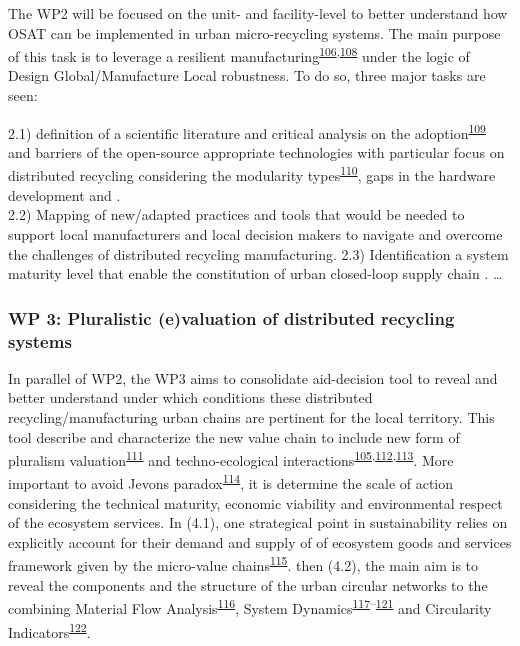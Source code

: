 \documentclass[
  11pt,
  a4paperpaper,
  onecolumn]{article}
\begin{document}
The WP2 will be focused on the unit- and facility-level to better
understand how OSAT can be implemented in urban micro-recycling systems.
The main purpose of this task is to leverage a resilient
manufacturing\textsuperscript{\protect\hyperlink{ref-xu2021e}{106},\protect\hyperlink{ref-zhang2011}{108}}
under the logic of Design Global/Manufacture Local robustness. To do so,
three major tasks are seen:

2.1) definition of a scientific literature and critical analysis on the
adoption\textsuperscript{\protect\hyperlink{ref-reinauer2021}{109}} and
barriers of the open-source appropriate technologies with particular
focus on distributed recycling considering the modularity
types\textsuperscript{\protect\hyperlink{ref-gavras2021}{110}}, gaps in
the hardware development and .\\
2.2) Mapping of new/adapted practices and tools that would be needed to
support local manufacturers and local decision makers to navigate and
overcome the challenges of distributed recycling manufacturing. 2.3)
Identification a system maturity level that enable the constitution of
urban closed-loop supply chain . \ldots{}

\hypertarget{wp-3-pluralistic-evaluation-of-distributed-recycling-systems}{%
\subsubsection{WP 3: Pluralistic (e)valuation of distributed recycling
systems}\label{wp-3-pluralistic-evaluation-of-distributed-recycling-systems}}

In parallel of WP2, the WP3 aims to consolidate aid-decision tool to
reveal and better understand under which conditions these distributed
recycling/manufacturing urban chains are pertinent for the local
territory. This tool describe and characterize the new value chain to
include new form of pluralism
valuation\textsuperscript{\protect\hyperlink{ref-gunton2022}{111}} and
techno-ecological
interactions\textsuperscript{\protect\hyperlink{ref-Saladini2018}{105},\protect\hyperlink{ref-Liu2020c}{112},\protect\hyperlink{ref-Liu2019g}{113}}.
More important to avoid Jevons
paradox\textsuperscript{\protect\hyperlink{ref-giampietro2018}{114}}, it
is determine the scale of action considering the technical maturity,
economic viability and environmental respect of the ecosystem services.
In (4.1), one strategical point in sustainability relies on explicitly
account for their demand and supply of of ecosystem goods and services
framework given by the micro-value
chains\textsuperscript{\protect\hyperlink{ref-Diwekar2021}{115}}. then
(4.2), the main aim is to reveal the components and the structure of the
urban circular networks to the combining Material Flow
Analysis\textsuperscript{\protect\hyperlink{ref-saidani2021}{116}},
System
Dynamics\textsuperscript{\protect\hyperlink{ref-kuo2021}{117}--\protect\hyperlink{ref-perez-perez2021}{121}}
and Circularity
Indicators\textsuperscript{\protect\hyperlink{ref-saidani2019}{122}}.
\end{document}

